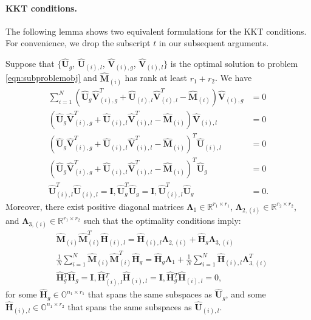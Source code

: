 \documentclass[twoside,11pt]{article}
\newcommand{\matE}{\mathbf{E}}
\newcommand{\hmatH}{{\hat{\mathbf{H}}}{}}
\newcommand{\matI}{\mathbf{I}}
\newcommand{\matLst}{{\mathbf{L}^\star}}
\newcommand{\matLambda}{\mathbf{\Lambda}}
\newcommand{\hmatM}{\hat{\mathbf{M}}}
\newcommand{\hmatU}{\hat{\mathbf{U}}}
\newcommand{\hmatV}{\hat{\mathbf{V}}}
\begin{document}
\paragraph{KKT conditions.} 

The following lemma shows two equivalent formulations for the KKT conditions. For convenience, we drop the subscript $t$ in our subsequent arguments.

\begin{lemma}
\label{lm:kktcondition}
Suppose that $\{\hmatU_g$, $\hmatU_{(i),l}$, $\hmatV_{(i),g}$, $\hmatV_{(i),l}\}$ is the optimal solution to problem \eqref{eqn:subproblemobj} and $\hmatM_{(i)}$ has rank at least $r_1+r_2$. We have
\begin{subequations}
\label{eqn:kktinnerloop1}
\begin{align}
\label{subeqn:kktinnerloopug}\sum_{i=1}^N\left(\hmatU_g\hmatV_{(i),g}^T+\hmatU_{(i),l}\hmatV_{(i),l}^T-\hmatM_{(i)}\right)\hmatV_{(i),g}&=0\\
\label{subeqn:kktinnerloopuil}\left(\hmatU_g\hmatV_{(i),g}^T+\hmatU_{(i),l}\hmatV_{(i),l}^T-\hmatM_{(i)}\right)\hmatV_{(i),l}&=0\\
\label{subeqn:kktinnerloopvil}\left(\hmatU_g\hmatV_{(i),g}^T+\hmatU_{(i),l}\hmatV_{(i),l}^T-\hmatM_{(i)}\right)^T\hmatU_{(i),l}&=0\\
\label{subeqn:kktinnerloopvig}\left(\hmatU_g\hmatV_{(i),g}^T+\hmatU_{(i),l}\hmatV_{(i),l}^T-\hmatM_{(i)}\right)^T\hmatU_{g}&=0\\
\label{subeqn:kktinnerloopxonstraint}\hmatU_{(i),l}^T\hmatU_{(i),l}=\matI, \hmatU_{g}^T\hmatU_{g}=\matI, \hmatU_{(i),l}^T\hmatU_{g}&=0.
\end{align}%
\end{subequations}
Moreover, %
there exist positive diagonal matrices $\matLambda_{1}\in \mathbb{R}^{r_1\times r_1}$, $\matLambda_{2,(i)}\in \mathbb{R}^{r_2\times r_2}$, and $\matLambda_{3,(i)}\in \mathbb{R}^{r_1\times r_2}$ such that
the optimality conditions imply:
\begin{subequations}
\label{eqn:kktderivations}
\begin{align}
&\label{subeqn:kkthil}\hmatM_{(i)}\hmatM_{(i)}^T\hmatH_{(i),l}=\hmatH_{(i),l}\bm{\Lambda}_{2,(i)}+\hmatH_g\bm{\Lambda}_{3,(i)}\\
&\label{subeqn:kkthg}\frac{1}{N}\sum_{i=1}^N\hmatM_{(i)}\hmatM_{(i)}^T\hmatH_g=\hmatH_g\bm{\Lambda}_{1}+\frac{1}{N}\sum_{i=1}^N\hmatH_{(i),l}\bm{\Lambda}_{3,(i)}^T\\
&\label{subeqn:kktconstraint}\hmatH_g^T\hmatH_g=\mathbf{I},\hmatH_{(i),l}^T\hmatH_{(i),l}=\mathbf{I},\hmatH_g^T\hmatH_{(i),l}=0,
\end{align}
\end{subequations}
for some $\hmatH_{g}\in \mathbb{O}^{n_1\times r_1}$ that spans the same subspaces as $\hmatU_g$, and some $\hmatH_{(i),l}\in \mathbb{O}^{n_1\times r_2}$ that spans the same subspaces as $\hmatU_{(i),l}$.
\end{lemma}
\end{document}
